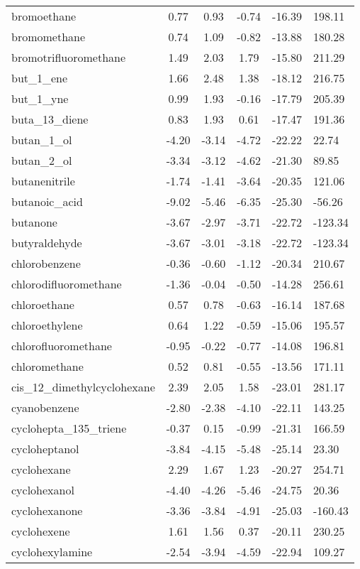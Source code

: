 \documentclass{amsart}
\begin{document}
\begin{longtable}{L|C|C|C|X|X}
bromoethane & 0.77 & 0.93 & -0.74 & -16.39 & 198.11 \\ 
bromomethane & 0.74 & 1.09 & -0.82 & -13.88 & 180.28 \\ 
bromotrifluoromethane & 1.49 & 2.03 & 1.79 & -15.80 & 211.29 \\ 
but\_1\_ene & 1.66 & 2.48 & 1.38 & -18.12 & 216.75 \\ 
but\_1\_yne & 0.99 & 1.93 & -0.16 & -17.79 & 205.39 \\ 
buta\_13\_diene & 0.83 & 1.93 & 0.61 & -17.47 & 191.36 \\ 
butan\_1\_ol & -4.20 & -3.14 & -4.72 & -22.22 & 22.74 \\ 
butan\_2\_ol & -3.34 & -3.12 & -4.62 & -21.30 & 89.85 \\ 
butanenitrile & -1.74 & -1.41 & -3.64 & -20.35 & 121.06 \\ 
butanoic\_acid & -9.02 & -5.46 & -6.35 & -25.30 & -56.26 \\ 
butanone & -3.67 & -2.97 & -3.71 & -22.72 & -123.34 \\ 
butyraldehyde & -3.67 & -3.01 & -3.18 & -22.72 & -123.34 \\ 
chlorobenzene & -0.36 & -0.60 & -1.12 & -20.34 & 210.67 \\ 
chlorodifluoromethane & -1.36 & -0.04 & -0.50 & -14.28 & 256.61 \\ 
chloroethane & 0.57 & 0.78 & -0.63 & -16.14 & 187.68 \\ 
chloroethylene & 0.64 & 1.22 & -0.59 & -15.06 & 195.57 \\ 
chlorofluoromethane & -0.95 & -0.22 & -0.77 & -14.08 & 196.81 \\ 
chloromethane & 0.52 & 0.81 & -0.55 & -13.56 & 171.11 \\ 
cis\_12\_dimethylcyclohexane & 2.39 & 2.05 & 1.58 & -23.01 & 281.17 \\ 
cyanobenzene & -2.80 & -2.38 & -4.10 & -22.11 & 143.25 \\ 
cyclohepta\_135\_triene & -0.37 & 0.15 & -0.99 & -21.31 & 166.59 \\ 
cycloheptanol & -3.84 & -4.15 & -5.48 & -25.14 & 23.30 \\ 
cyclohexane & 2.29 & 1.67 & 1.23 & -20.27 & 254.71 \\ 
cyclohexanol & -4.40 & -4.26 & -5.46 & -24.75 & 20.36 \\ 
cyclohexanone & -3.36 & -3.84 & -4.91 & -25.03 & -160.43 \\ 
cyclohexene & 1.61 & 1.56 & 0.37 & -20.11 & 230.25 \\ 
cyclohexylamine & -2.54 & -3.94 & -4.59 & -22.94 & 109.27 \\ 

\end{longtable}
\end{document}

